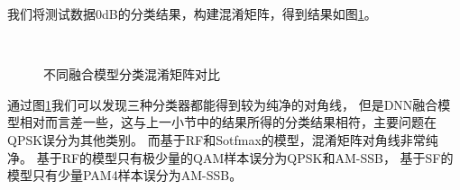 我们将测试数据0dB的分类结果，构建混淆矩阵，得到结果如图\ref{sec:fig_4_6}。\par
\begin{figure}[h]
	\centering
	\\
	\caption{不同融合模型分类混淆矩阵对比}
	\label{sec:fig_4_6}
\end{figure}

通过图\ref{sec:fig_4_6}我们可以发现三种分类器都能得到较为纯净的对角线，
但是DNN融合模型相对而言差一些，这与上一小节中的结果所得的分类结果相符，主要问题在QPSK误分为其他类别。
而基于RF和Sotfmax的模型，混淆矩阵对角线非常纯净。
基于RF的模型只有极少量的QAM样本误分为QPSK和AM-SSB，
基于SF的模型只有少量PAM4样本误分为AM-SSB。\par

